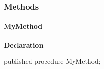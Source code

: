\documentclass{report}
\begin{document}
\subsubsection*{\large{\textbf{Methods}}\normalsize\hspace{1ex}\hfill}
\paragraph*{MyMethod}\hspace*{\fill}

\begin{list}{}{
\setlength{\itemindent}{0cm}
\setlength{\listparindent}{0cm}
\setlength{\leftmargin}{\evensidemargin}
\addtolength{\leftmargin}{\tmplength}
\settowidth{\labelsep}{X}
\addtolength{\leftmargin}{\labelsep}
\setlength{\labelwidth}{\tmplength}
}
\begin{flushleft}
\item[\textbf{Declaration}\hfill]
\begin{ttfamily}
published procedure MyMethod;\end{ttfamily}


\end{flushleft}
\end{list}
\end{document}
